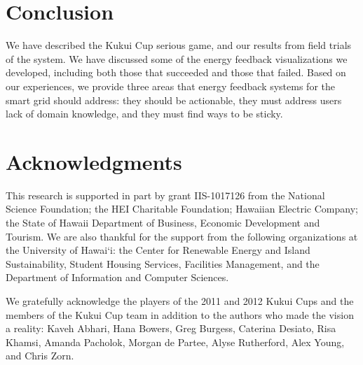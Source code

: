 \documentclass[10pt, conference, compsocconf]{IEEEtran-old}
\begin{document}
\section{Conclusion}

We have described the Kukui Cup serious game, and our results from field trials of the system. We have discussed some of the energy feedback visualizations we developed, including both those that succeeded and those that failed. Based on our experiences, we provide three areas that energy feedback systems for the smart grid should address: they should be actionable, they must address users lack of domain knowledge, and they must find ways to be sticky.


\section*{Acknowledgments}

This research is supported in part by grant IIS-1017126 from the National Science Foundation; the HEI Charitable Foundation; Hawaiian Electric Company; the State of Hawaii Department of Business, Economic Development and Tourism. We are also thankful for the support from the following organizations at the University of Hawai`i: the Center for Renewable Energy and Island Sustainability, Student Housing Services, Facilities Management, and the Department of Information and Computer Sciences.

We gratefully acknowledge the players of the 2011 and 2012 Kukui Cups and the members of the Kukui Cup team in addition to the authors who made the vision a reality: Kaveh Abhari, Hana Bowers, Greg Burgess, Caterina Desiato, Risa Khamsi, Amanda Pacholok, Morgan de Partee, Alyse Rutherford, Alex Young, and Chris Zorn.


%
%
\end{document}
